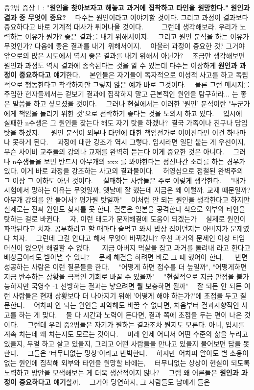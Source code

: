 중2병 증상 1 : "\textbf{원인을 찾아보자고 해놓고 과거에 집착하고 타인을 원망한다."}
\textbf{원인과 결과 중 무엇이 중요?}   다수는 원인이라고 이야기할 것이다. 그리고 과정이 결과보다 중요하다고 바로 기계적 대사가 튀어나올 것이다.      그런데 생각해보라. 우리가 노력하는 이유가 뭔가? 좋은 결과를 내기 위해서이지.   그리고 원인 분석을 하는 이유가 무엇인가? 다음에 좋은 결과를 내기 위해서이지.   아울러 과정이 중요한 것? 그거야 앞으로의 많은 시도에서 역시 좋은 결과를 내기 위해서 아닌가?   조금만 생각해보면 원인과 과정도 역시 결과에 종속된다는 것을 알 수 있는데 다수는 이상하게 \textbf{원인과 과정이 중요하다고 얘기}한다.   본인들은 자기들이 독자적으로 이성적 사고를 하고 독립적으로 행동한다고 착각하지만 그렇지 않은 예가 바로 그것이다.   물론 그런 메시지를 주입한 현자들께서는 겉보기 결과에 집착하지 말고 근본적인 원인을 탐구하라... 는 좋은 말씀을 하고 싶으셨을 것이다.   그러나 현실에서는 이러한 '원인' 분석이란 "누군가에게 책임을 돌리기 위한 것"으로 전락하기 좋다는 것을 도외시 하고 있다.   입시에 실패한 n수생은 그 원인을 찾는다 해도 자기 탓을 하겠나? 결국 가족이나 친구나 담임 탓을 하겠지.    원인 분석이 외부나 타인에 대한 책임전가로 이어진다면 이건 하나마나 못하게 된다.   과정에 대한 강조가 역시 그렇다. 입시라면 일단 붙는 게 우선이지, 무슨 사이비 교주들의 강의나 교재를 완벽히 듣는다 이게 중요한 것은 아니다.   그러나 n수생들을 보면 반드시 아무개의 xxx 를 봐야한다는 정신나간 소리를 하는 경우가 있다. 이게 바로 과정을 강조하는 사고의 결과물이다.   허영심으로 점철된 완벽주의 그 이상 그 이하도 아닌 것이다.   실패하는 사람들은 주로 이렇게 생각한다.   "내가 시험에서 망하는 이유는 무엇일까, 옛날에 잘 했는데 지금은 왜 이럴까. 교재 때문일까? 아무개 강의를 안 들어서? 평가원 탓일까"   이처럼 안 되는 원인을 생각한다고 하지만 실제로는 진짜 원인도 찾지를 못 한다. 결론은 일본을 공격한다 식으로 외부와 타인을 탓하는 걸로 바뀐다.   자, 이런 태도가 문제해결에 도움이 되겠는가   실제로 원인이 파악된다고 치자. 공부하려고 할 때마다 술먹고 와서 밥상 집어던지는 아버지가 문제였다 치자.   그런데 그걸 안다고 해서 무엇이 바뀌겠나? 우선 과거의 문제인 이상 타임머신이 없으면 해결할 수 없다.    지금 아버지 멱살을 잡고 과거를 돌려내 라고 한다고 배상금이라도 받아낼 수 있나?   문제 해결을 하려면 바로 그 때 했어야 한다.    반면 성공하는 사람은 이런 질문들을 한다.   "어떻게 하면 점수를 더 높일까", "어떻게하면 지금 반수하는 상황을 극적인 기회로 바꿀 수 있을까"   "현실적으로 지금 만점을 불가능하지만 국영수 -1 선방하는 결과는 낳으려면 뭘 보충하면 될까"   잘 되든 안 되든 이런 사람들은 현재 상황보다 더 나아지기 위해 '어떻게 해야 하는가?'에 초점을 두고 질문한다.   어차피 안 되는 원인을 파악해도 바꿀 수 없다면, 처음부터 결과지향적인 사고를 하는 게 맞다.   둘 다 시간과 노력이 든다면, 결과 쪽에 초점을 두는 편이 나은 것이다.   그런데 우리 중2병들은 자기가 원하는 결과조차 뭔지도 모른다. 아니, 입시를 계속 치는데 왜 치는지도 모르는 것이다.   미래 언제 어디서 어떤 수준의 삶을 누리고 있을지, 무얼 하고 살고 있을지, 그리고 어떤 사람들을 만나고 있을지 물어보면 답을 못 한다.   그들은 '터무니없는 망상'이라고 반박한다.   하지만 어차피 알아도 별 소용이 없는 원인에 집착해 외부와 타인을 원망할 바에는,   터무니없는 상상이 현실이 되도록 노력하고 방안을 모색해보는 게 더욱 생산적이지 않나?   그럼 왜 어른들은 \textbf{원인과 과정이 중요하다고 얘기}할까.   그거야 당연하지, 그 사람들도 남에게 들은 
